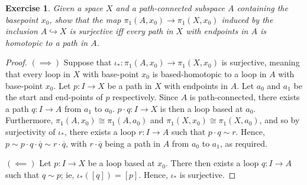 \documentclass{article}
\newtheorem{exercise}{Exercise}[subsection]
\begin{document}
\begin{exercise}
Given a space $X$ and a path-connected subspace $A$ containing the basepoint $x_0$, show that the map $\pi_1(A,x_0)\to\pi_1(X,x_0)$ induced by the inclusion $A\hookrightarrow X$ is surjective iff every path in $X$ with endpoints in $A$ is homotopic to a path in $A$.
\end{exercise}
\begin{proof}
$(\implies)$ Suppose that $\iota_*:\pi_1(A,x_0)\to\pi_1(X,x_0)$ is surjective, meaning that every loop in $X$ with base-point $x_0$ is based-homotopic to a loop in $A$ with base-point $x_0$. Let $p:I\to X$ be a path in $X$ with endpoints in $A$. Let $a_0$ and $a_1$ be the start and end-points of $p$ respectively. Since $A$ is path-connected, there exists a path $q:I\to A$ from $a_1$ to $a_0$. $p\cdot q:I\to X$ is then a loop based at $a_0$. Furthermore, $\pi_1(A,x_0)\cong\pi_1(A,a_0)$ and $\pi_1(X,x_0)\cong\pi_1(X,a_0)$, and so by surjectivity of $\iota_*$, there exists a loop $r:I\to A$ such that $p\cdot q\sim r$. Hence, $p\sim p\cdot q\cdot \overline{q}\sim r\cdot\overline{q}$, with $r\cdot\overline{q}$ being a path in $A$ from $a_0$ to $a_1$, as required.

$(\impliedby)$ Let $p:I\to X$ be a loop based at $x_0$. There then exists a loop $q:I\to A$ such that $q\sim p$; ie, $\iota_*([q])=[p]$. Hence, $\iota_*$ is surjective.
\end{proof}
\end{document}
